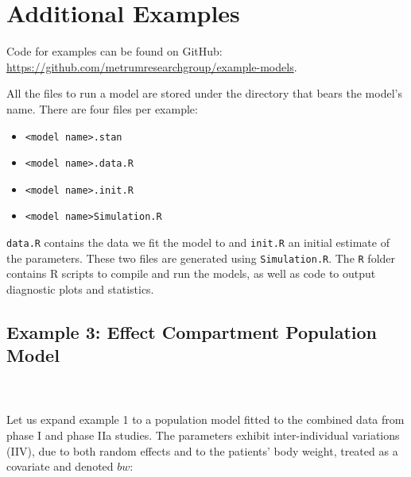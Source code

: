 \documentclass[11pt]{amsart}
\begin{document}
\clearpage

\section{Additional Examples}

Code for examples can be found on GitHub: \url{https://github.com/metrumresearchgroup/example-models}.

All the files to run a model are stored under the directory that bears the model's name. There are four files per example:
\begin{itemize}
  \item \texttt{<model name>.stan}
  \item \texttt{<model name>.data.R}
  \item \texttt{<model name>.init.R}
  \item \texttt{<model name>Simulation.R}
\end{itemize}

\texttt{data.R} contains the data we fit the model to and \texttt{init.R} an initial estimate of the parameters. These two files are generated using \texttt{Simulation.R}. The \texttt{R} folder contains R scripts to compile and run the models, as well as code to output diagnostic plots and statistics.

\subsection {Example 3: Effect Compartment Population Model} \ \\ \ \\
Let us expand example 1 to a population model fitted to the combined data from phase I and phase IIa studies. The parameters exhibit inter-individual variations (IIV), due to both random effects and to the patients' body weight, treated as a covariate and denoted $bw$:
\end{document}
